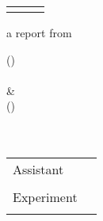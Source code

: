 \begin{titlepage}
	\begin{tabular}{l p{9.0cm} r}
		 &  &
		\end{tabular}
		\begin{center}	
		
		\vspace{2.5cm}		
		\fontsize{17.28pt}{30}
		\textbf{\Title}		
		\vspace{1.5cm}
		
		\fontsize{14pt}{30}
		\vspace{1.5cm}
		
		a report from
		
		\vspace{0.5cm}
		\textbf{\Authora} \hspace{1.0cm} (\IDa) \\
		\eMaila \\
		
		\vspace{0.5cm}
		 \& \\
		
		\vspace{0.5cm}
		\textbf{\Authorb} \hspace{1.0cm} (\IDb) \\
		\eMailb \\
		
		\vspace{1.5cm}
		\textbf{\Group}\\
		
	\end{center}
	\vfill
	\normalsize
	\begin{tabular}{ll}
		Assistant				&	\Assistant \\ \\
		Experiment			&	\Date 	\\ \\
	\end{tabular}
\end{titlepage}
